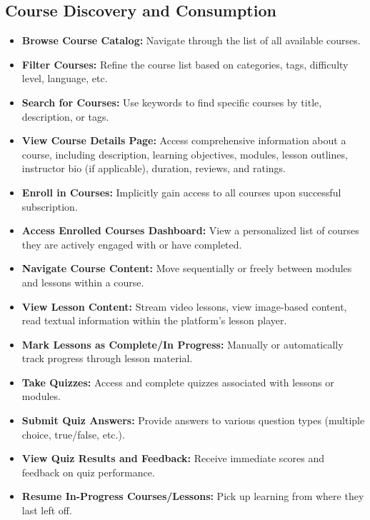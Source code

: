 \documentclass[12pt, a4paper]{report} %
\begin{document}
  \subsection{Course Discovery and Consumption}
    \begin{itemize}
        \item \textbf{Browse Course Catalog:} Navigate through the list of all available courses.
        \item \textbf{Filter Courses:} Refine the course list based on categories, tags, difficulty level, language, etc.
        \item \textbf{Search for Courses:} Use keywords to find specific courses by title, description, or tags.
        \item \textbf{View Course Details Page:} Access comprehensive information about a course, including description, learning objectives, modules, lesson outlines, instructor bio (if applicable), duration, reviews, and ratings.
        \item \textbf{Enroll in Courses:} Implicitly gain access to all courses upon successful subscription.
        \item \textbf{Access Enrolled Courses Dashboard:} View a personalized list of courses they are actively engaged with or have completed.
        \item \textbf{Navigate Course Content:} Move sequentially or freely between modules and lessons within a course.
        \item \textbf{View Lesson Content:} Stream video lessons, view image-based content, read textual information within the platform's lesson player.
        \item \textbf{Mark Lessons as Complete/In Progress:} Manually or automatically track progress through lesson material.
        \item \textbf{Take Quizzes:} Access and complete quizzes associated with lessons or modules.
        \item \textbf{Submit Quiz Answers:} Provide answers to various question types (multiple choice, true/false, etc.).
        \item \textbf{View Quiz Results and Feedback:} Receive immediate scores and feedback on quiz performance.
        \item \textbf{Resume In-Progress Courses/Lessons:} Pick up learning from where they last left off.
    \end{itemize}
\end{document}
